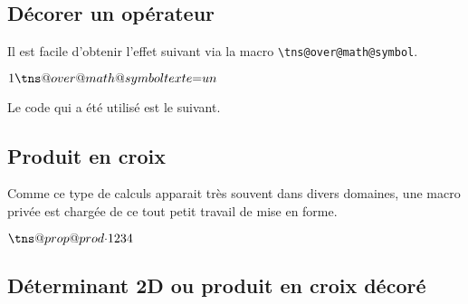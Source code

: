 \documentclass[12pt,a4paper]{article}
\newcommand\env[1]{\texttt{#1}}
\newcommand\macro[1]{\env{\textbackslash{}#1}}
\theoremstyle{definition}
\begin{document}
{{{{{{{{{{{%

\subsection{Décorer un opérateur}

Il est facile d'obtenir l'effet suivant via la macro \macro{tns@over@math@symbol}.

\makeatletter
\newcommand\eqtxt{\tns@over@math@symbol{texte}{=}}
\makeatother

\begin{latexex}
$1 \eqtxt un$
\end{latexex}


Le code qui a été utilisé est le suivant.


\begin{latexex-alone}
\newcommand\eqtxt{\tns@over@math@symbol{texte}{=}}
\end{latexex-alone}




\subsection{Produit en croix}

Comme ce type de calculs apparait très souvent dans divers domaines, une macro privée est chargée de ce tout petit travail de mise en forme.

\begin{latexex}
\makeatletter
$\tns@prop@prod{\cdot} %
               {1}{2}  %
               {3}{4}$ %
\makeatother
\end{latexex}



\subsection{Déterminant 2D ou produit en croix décoré}

}}}}}}}}}}}
\end{document}
